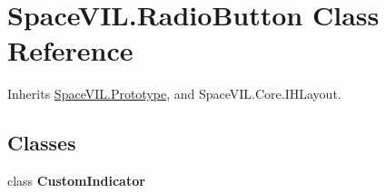 \hypertarget{class_space_v_i_l_1_1_radio_button}{}\section{Space\+V\+I\+L.\+Radio\+Button Class Reference}
\label{class_space_v_i_l_1_1_radio_button}


Inherits \mbox{\hyperlink{class_space_v_i_l_1_1_prototype}{Space\+V\+I\+L.\+Prototype}}, and Space\+V\+I\+L.\+Core.\+I\+H\+Layout.

\subsection*{Classes}
\begin{DoxyCompactItemize}
\item 
class {\bfseries Custom\+Indicator}
\end{DoxyCompactItemize}

